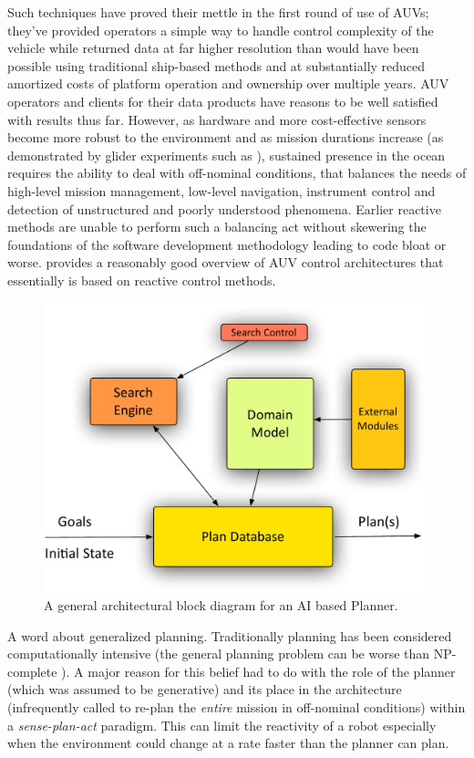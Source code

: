 Such techniques have proved their mettle in the first round of use of
AUVs; they've provided operators a simple way to handle control
complexity of the vehicle while returned data at far higher resolution
than would have been possible using traditional ship-based methods and
at substantially reduced amortized costs of platform operation and
ownership over multiple years. AUV operators and clients for their
data products have reasons to be well satisfied with results thus
far. However, as hardware and more cost-effective sensors become more
robust to the environment and as mission durations increase (as
demonstrated by glider experiments such as \cite{rucool11}), sustained
presence in the ocean requires the ability to deal with off-nominal
conditions, that balances the needs of high-level mission management,
low-level navigation, instrument control and detection of unstructured
and poorly understood phenomena. Earlier reactive methods are unable
to perform such a balancing act without skewering the foundations of
the software development methodology leading to code bloat or worse.
\cite{carreras06} provides a reasonably good overview of AUV control
architectures that essentially is based on reactive control methods.

\begin{figure}[!t]
 \centering
 \includegraphics[scale=0.4]{figs/planner-arch.pdf}
 \caption{\small A general architectural block diagram for an AI based
   Planner.}
 \label{fig:planner}
\end{figure}

A word about generalized planning. Traditionally planning has been
considered computationally intensive (the general planning problem can
be worse than NP-complete \cite{ghallab04}). A major reason for this
belief had to do with the role of the planner (which was assumed to be
generative) and its place in the architecture (infrequently called to
re-plan the \emph{entire} mission in off-nominal conditions) within a
\emph{sense-plan-act} paradigm. This can limit the reactivity of a
robot especially when the environment could change at a rate faster
than the planner can plan.  

